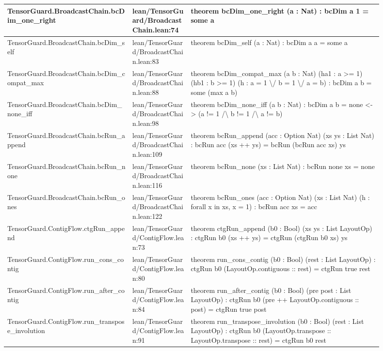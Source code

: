\documentclass[10pt]{article}
\begin{document}
\begin{longtable}{|p{0.30\linewidth}|p{0.14\linewidth}|p{0.46\linewidth}|}
TensorGuard.BroadcastChain.bcDim\_one\_right & lean/TensorGuard/BroadcastChain.lean:74 & theorem bcDim\_one\_right (a : Nat) : bcDim a 1 = some a \\
\hline
TensorGuard.BroadcastChain.bcDim\_self & lean/TensorGuard/BroadcastChain.lean:83 & theorem bcDim\_self (a : Nat) : bcDim a a = some a \\
\hline
TensorGuard.BroadcastChain.bcDim\_compat\_max & lean/TensorGuard/BroadcastChain.lean:88 & theorem bcDim\_compat\_max (a b : Nat) (ha1 : a >= 1) (hb1 : b >= 1) (h : a = 1 \textbackslash{}/ b = 1 \textbackslash{}/ a = b) : bcDim a b = some (max a b) \\
\hline
TensorGuard.BroadcastChain.bcDim\_none\_iff & lean/TensorGuard/BroadcastChain.lean:98 & theorem bcDim\_none\_iff (a b : Nat) : bcDim a b = none <-> (a != 1 /\textbackslash{} b != 1 /\textbackslash{} a != b) \\
\hline
TensorGuard.BroadcastChain.bcRun\_append & lean/TensorGuard/BroadcastChain.lean:109 & theorem bcRun\_append (acc : Option Nat) (xs ys : List Nat) : bcRun acc (xs ++ ys) = bcRun (bcRun acc xs) ys \\
\hline
TensorGuard.BroadcastChain.bcRun\_none & lean/TensorGuard/BroadcastChain.lean:116 & theorem bcRun\_none (xs : List Nat) : bcRun none xs = none \\
\hline
TensorGuard.BroadcastChain.bcRun\_ones & lean/TensorGuard/BroadcastChain.lean:122 & theorem bcRun\_ones (acc : Option Nat) (xs : List Nat) (h : forall x in xs, x = 1) : bcRun acc xs = acc \\
\hline
TensorGuard.ContigFlow.ctgRun\_append & lean/TensorGuard/ContigFlow.lean:73 & theorem ctgRun\_append (b0 : Bool) (xs ys : List LayoutOp) : ctgRun b0 (xs ++ ys) = ctgRun (ctgRun b0 xs) ys \\
\hline
TensorGuard.ContigFlow.run\_cons\_contig & lean/TensorGuard/ContigFlow.lean:80 & theorem run\_cons\_contig (b0 : Bool) (rest : List LayoutOp) : ctgRun b0 (LayoutOp.contiguous :: rest) = ctgRun true rest \\
\hline
TensorGuard.ContigFlow.run\_after\_contig & lean/TensorGuard/ContigFlow.lean:84 & theorem run\_after\_contig (b0 : Bool) (pre post : List LayoutOp) : ctgRun b0 (pre ++ LayoutOp.contiguous :: post) = ctgRun true post \\
\hline
TensorGuard.ContigFlow.run\_transpose\_involution & lean/TensorGuard/ContigFlow.lean:91 & theorem run\_transpose\_involution (b0 : Bool) (rest : List LayoutOp) : ctgRun b0 (LayoutOp.transpose :: LayoutOp.transpose :: rest) = ctgRun b0 rest \\

\end{longtable}
\end{document}
